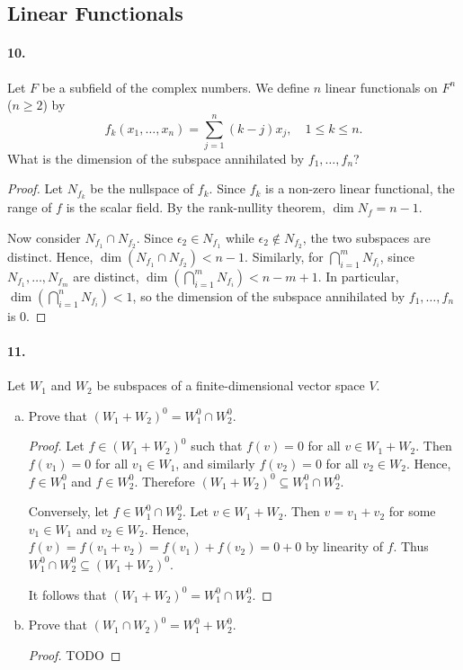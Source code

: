 \documentclass{article}
\begin{document}
\subsection{Linear Functionals}

\paragraph{10.} Let $F$ be a subfield of the complex numbers. We define $n$
linear functionals on $F^n$ ($n \geq 2$) by \[
  f_k(x_1, \ldots, x_n) = \sum_{j=1}^n (k - j)x_j,\quad
  1 \leq k \leq n.
\] What is the dimension of the subspace annihilated by $f_1, \ldots, f_n$?

\begin{proof}
  Let $N_{f_k}$ be the nullspace of $f_k$. Since $f_k$ is a non-zero linear
  functional, the range of $f$ is the scalar field. By the rank-nullity theorem,
  $\dim N_f = n - 1$.

  Now consider $N_{f_1} \cap N_{f_2}$. Since $\epsilon_2 \in N_{f_1}$ while
  $\epsilon_2 \not\in N_{f_2}$, the two subspaces are distinct. Hence,
  $\dim(N_{f_1} \cap N_{f_2}) < n - 1$. Similarly, for
  $\bigcap_{i=1}^m N_{f_i}$, since $N_{f_1}, \ldots, N_{f_m}$ are distinct,
  $\dim(\bigcap_{i=1}^m N_{f_i}) < n - m + 1$. In particular,
  $\dim(\bigcap_{i=1}^n N_{f_i}) < 1$, so the dimension of the subspace
  annihilated by $f_1, \ldots, f_n$ is 0.
\end{proof}

\paragraph{11.} Let $W_1$ and $W_2$ be subspaces of a finite-dimensional vector
space $V$.

\begin{enumerate}[(a)]
  \item Prove that $(W_1 + W_2)^0 = W_1^0 \cap W_2^0$.
    \begin{proof}
      Let $f \in (W_1 + W_2)^0$ such that $f(v) = 0$ for all $v \in W_1 + W_2$.
      Then $f(v_1) = 0$ for all $v_1 \in W_1$, and similarly $f(v_2) = 0$ for
      all $v_2 \in W_2$. Hence, $f \in W_1^0$ and $f \in W_2^0$. Therefore
      $(W_1 + W_2)^0 \subseteq W_1^0 \cap W_2^0$.

      Conversely, let $f \in W_1^0 \cap W_2^0$. Let $v \in W_1 + W_2$. Then $v =
      v_1 + v_2$ for some $v_1 \in W_1$ and $v_2 \in W_2$. Hence, $f(v) = f(v_1
      + v_2) = f(v_1) + f(v_2) = 0 + 0$ by linearity of $f$. Thus $W_1^0 \cap
      W_2^0 \subseteq (W_1 + W_2)^0$.

      It follows that $(W_1 + W_2)^0 = W_1^0 \cap W_2^0$.
    \end{proof}
  \item Prove that $(W_1 \cap W_2)^0 = W_1^0 + W_2^0$.
    \begin{proof}
      TODO
    \end{proof}
\end{enumerate}
\end{document}
